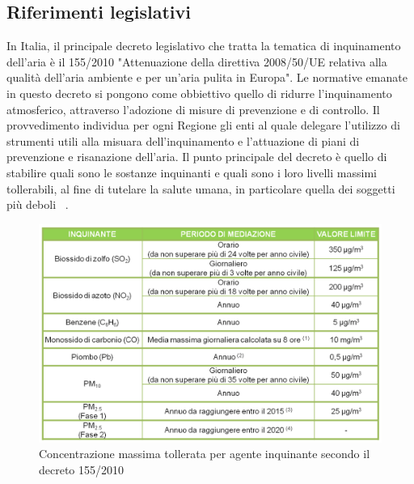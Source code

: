 \subsection{Riferimenti legislativi}
In Italia, il principale decreto legislativo che tratta la tematica di inquinamento dell'aria è il 155/2010 "Attenuazione della direttiva 2008/50/UE relativa alla qualità dell'aria ambiente e per un'aria pulita in Europa".
Le normative emanate in questo decreto si pongono come obbiettivo quello di ridurre l'inquinamento atmosferico, attraverso l'adozione di misure di prevenzione e di controllo.
Il provvedimento individua per ogni Regione gli enti al quale delegare l'utilizzo di strumenti utili alla misuara dell'inquinamento e l'attuazione di piani di prevenzione e risanazione dell'aria.
Il punto principale del decreto è quello di stabilire quali sono le sostanze inquinanti e quali sono i loro livelli massimi tollerabili, al fine di tutelare la salute umana, in particolare quella dei soggetti più deboli ~\cite{arpa_veneto}.
\begin{figure}
  \includegraphics[width=\linewidth]{img/livelli.png}
  \caption{Concentrazione massima tollerata per agente inquinante secondo il decreto 155/2010}
  \label{fig:livelli}
\end{figure}


